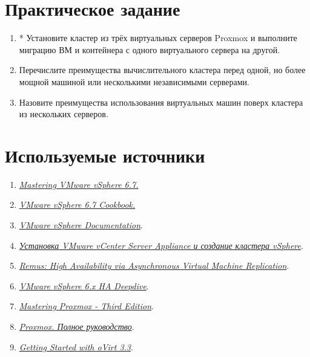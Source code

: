 \documentclass[14pt, a4paper]{article}
\begin{document}
\newpage

\section*{Практическое задание} 

\begin{enumerate}
    \item * Установите кластер из трёх виртуальных серверов Proxmox и выполните миграцию ВМ и
    контейнера с одного виртуального сервера на другой.
    \item Перечислите преимущества вычислительного кластера перед одной, но более мощной
    машиной или несколькими независимыми серверами.
    \item Назовите преимущества использования виртуальных машин поверх кластера из нескольких
    серверов.
\end{enumerate}

\section*{Используемые источники} 

\begin{enumerate}
    \item \href{https://www.amazon.com/Mastering-VMware-vSphere-Nick-Marshall/dp/1119512948}{\textit{Mastering VMware vSphere 6.7.}}
    \item \href{https://www.amazon.com/VMware-vSphere-6-7-Cookbook-orchestrate/dp/1789953006}{\textit{VMware vSphere 6.7 Cookbook.}}
    \item \href{https://docs.vmware.com/en/VMware-vSphere/index.html}{\textit{VMware vSphere Documentation}}.
    \item \href{https://medium.com/@alexander.bazhenov/установка-vmware-vcenter-server-appliance-5beb779ff2c3}{\textit{Установка VMware vCenter Server Appliance и создание кластера vSphere}}.
    \item \href{https://www.usenix.org/legacy/event/nsdi08/tech/full_papers/cully/cully_html/index.html}{\textit{Remus: High Availability via Asynchronous Virtual Machine Replication}}.
    \item \href{https://www.vmgu.ru/ext/books/vsphere-ha-deepdive.pdf}{\textit{VMware vSphere 6.x HA Deepdive}}.
    \item \href{https://www.packtpub.com/product/mastering-proxmox-second-edition/9781785888243}{\textit{Mastering Proxmox - Third Edition}}.
    \item \href{http://onreader.mdl.ru/MasteringProxmox.3ed/content/index.html}{\textit{Proxmox. Полное руководство}}.
    \item \href{https://subscription.packtpub.com/search?query=getting%20started%20ovirt%2033}{\textit{Getting Started with oVirt 3.3}}.
\end{enumerate}
\end{document}
